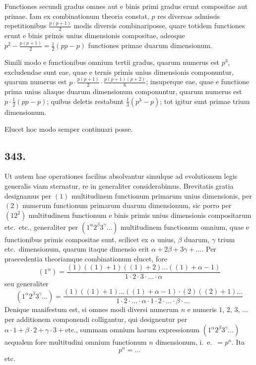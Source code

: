 \documentclass[12pt]{article}
\begin{document}
Functiones secundi gradus omnes aut e binis primi gradus erunt compositae aut primae. Iam ex combinationum theoria constat, $p$ res diversas admissis repetitionibus $\frac{p(p+1)}{2}$ modis diversis combinariposse, quare totidem functiones erunt e binis primis unius dimensionis compositae, adeoque $p^2 - \frac{p(p+1)}{2} = \frac{1}{2}(pp-p)$ functiones primae duarum dimensionum.

Simili modo e functionibus omnium tertii gradus, quarum numerus est $p^3$, excludendae sunt eae, quae e ternis primis unius dimensionis componuntur, quarum numerus est $p\cdot\frac{p(p+1)}{2}\cdot\frac{p(p+1)(p+2)}{6}$; insuperque eae, quae e functione prima unius aliaque duarum dimensionum componuntur, quarum numerus est $p\cdot\frac{1}{2}(pp-p)$; quibus deletis restabunt $\frac{1}{3}(p^3-p)$; tot igitur sunt primae trium dimensionum.

Elucet hoc modo semper continuari posse.

\subsection*{343.}

Ut autem hae operationes facilius absolvantur simulque ad evolutionem legis generalis viam sternatur, re in generaliter considerabimus. Brevitatis gratia designamus per $(1)$ multitudinem functionum primarum unius dimensionis, per $(2)$ numerum functionum primarum duarum dimensionum, sic porro per $(12^2)$ multitudinem functionum e binis primis unius dimensionis compositarum etc.~etc., generaliter per $(1^\alpha 2^\beta 3^\gamma \ldots)$ multitudinem functionum omnium, quae e functionibus primis compositae sunt, scilicet ex $\alpha$ unius, $\beta$ duarum, $\gamma$ trium etc.~dimensionum, quarum itaque dimensio erit $\alpha+2\beta+3\gamma+\ldots$. Per praecedentia theoriamque combinationum elucet, fore
\[
(1^\alpha) = \frac{(1)((1)+1)((1)+2)\ldots((1)+\alpha-1)}{1\cdot 2\cdot 3\cdot \ldots \cdot \alpha}
\]
seu generaliter
\[
(1^\alpha 2^\beta 3^\gamma \ldots) = \frac{(1)((1)+1)\ldots ((1)+\alpha-1)\cdot (2)((2)+1)\ldots}{1\cdot 2\cdot \ldots \cdot \alpha \cdot 1\cdot 2\cdot \ldots \cdot \beta \cdot \ldots}
\]
Denique manifestum est, si omnes modi diversi numerum $n$ e numeris $1$, $2$, $3$, $\ldots$ per additionem componendi colligantur, qui designentur per $\alpha\cdot 1 + \beta\cdot 2 + \gamma\cdot 3 + \text{etc.}$, summam omnium harum expressionum $(1^\alpha 2^\beta 3^\gamma \ldots)$ aequalem fore multitudini omnium functionum $n$ dimensionum, i.~e.~$=p^n$. Ita
\[
p^n = \ldots
\]
etc.
\end{document}
